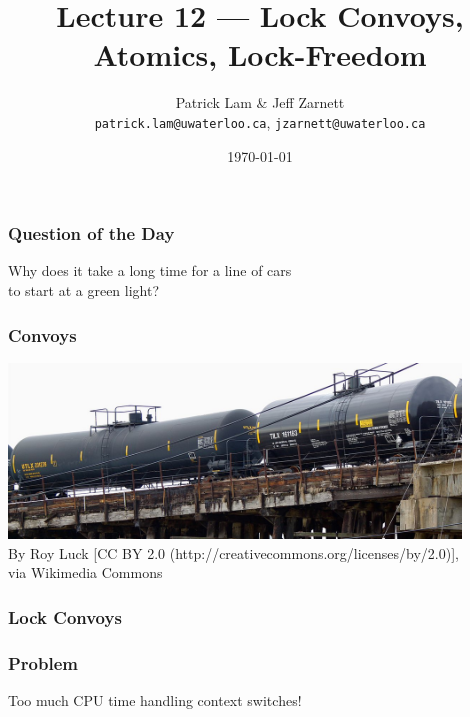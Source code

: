 

\title{Lecture 12 --- Lock Convoys, Atomics, Lock-Freedom}

\author{Patrick Lam \& Jeff Zarnett \\ \small \texttt{patrick.lam@uwaterloo.ca}, \texttt{jzarnett@uwaterloo.ca}}
\date{\today}




\begin{frame}
  \titlepage

 \end{frame}
 

\begin{frame}
\frametitle{Question of the Day}
\Large
\vspace*{-3em}
Why does it take a long time for a line of cars \\
to start at a green light?

\end{frame}

\begin{frame}
\frametitle{Convoys}
\begin{center}
\includegraphics[width=0.9\textwidth]{images/L08-DOT-111-convoy.jpg}\\
By Roy Luck [CC BY 2.0 (http://creativecommons.org/licenses/by/2.0)], \\
via Wikimedia Commons
\end{center}
\end{frame}

\begin{frame}
\frametitle{Lock Convoys}
\begin{center}
\scalebox{0.4}{
}
\end{center}
\end{frame}

\begin{frame}
\frametitle{Problem}
\begin{center}
\Large
\vspace*{-2em}
Too much CPU time handling context switches!
\end{center}
\end{frame}

